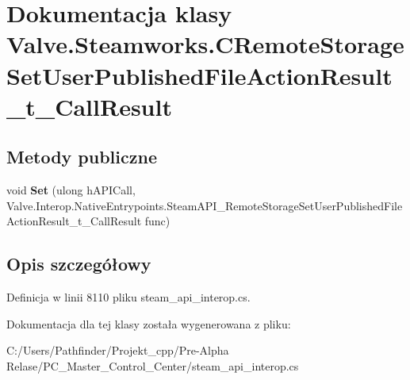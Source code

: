 \hypertarget{class_valve_1_1_steamworks_1_1_c_remote_storage_set_user_published_file_action_result__t___call_result}{}\section{Dokumentacja klasy Valve.\+Steamworks.\+C\+Remote\+Storage\+Set\+User\+Published\+File\+Action\+Result\+\_\+t\+\_\+\+Call\+Result}
\label{class_valve_1_1_steamworks_1_1_c_remote_storage_set_user_published_file_action_result__t___call_result}
\subsection*{Metody publiczne}
\begin{DoxyCompactItemize}
\item 
\mbox{\label{class_valve_1_1_steamworks_1_1_c_remote_storage_set_user_published_file_action_result__t___call_result_a76043e274480a793ad984c867367386e}} 
void {\bfseries Set} (ulong h\+A\+P\+I\+Call, Valve.\+Interop.\+Native\+Entrypoints.\+Steam\+A\+P\+I\+\_\+\+Remote\+Storage\+Set\+User\+Published\+File\+Action\+Result\+\_\+t\+\_\+\+Call\+Result func)
\end{DoxyCompactItemize}


\subsection{Opis szczegółowy}


Definicja w linii 8110 pliku steam\+\_\+api\+\_\+interop.\+cs.



Dokumentacja dla tej klasy została wygenerowana z pliku\+:\begin{DoxyCompactItemize}
\item 
C\+:/\+Users/\+Pathfinder/\+Projekt\+\_\+cpp/\+Pre-\/\+Alpha Relase/\+P\+C\+\_\+\+Master\+\_\+\+Control\+\_\+\+Center/steam\+\_\+api\+\_\+interop.\+cs\end{DoxyCompactItemize}

